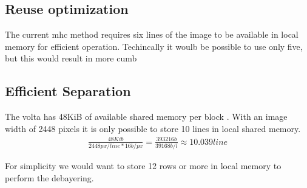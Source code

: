 \begin{table}[H]
\begin{minipage}[b]{.5\linewidth}
    \end{minipage}
    \caption{Comparison of the number of \gls{fma} operations required to get the desired output. On the left }
\end{table}

\subsection{Reuse optimization}
The current \gls{mhc} method requires six lines of the image to be available in local memory for efficient operation.
Techincally it woulb be possible to use only five, but this would result in more cumb


\subsection{Efficient Separation}
The \gls{volta} has 48KiB of available shared memory per block \cite{rigerunNVIDIAJetsonXavier2023}.
With an image width of 2448 pixels \cite{lucidvisionlabsTriton0MPPolarization} it is only possible to store 10 lines in local shared memory.
\begin{align}
    \frac{48Kib}{2448px/line * 16b/px} = \frac{393216b}{39168b/l} \approx 10.039line
\end{align}

For simplicity we would want to store 12 rows or more in local memory to perform the debayering.


